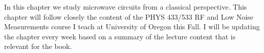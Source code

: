 
In this chapter we study microwave circuits from a classical perspective.
This chapter will follow closely the content of the PHYS 433/533 RF and Low Noise Measurements course I teach at University of Oregon this Fall. I will be updating the chapter every week based on a summary of the lecture content that is relevant for the book.
